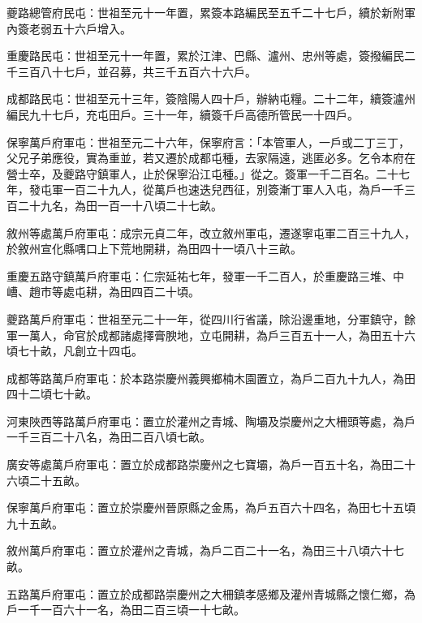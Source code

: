 \begin{pinyinscope}
 夔路總管府民屯：世祖至元十一年置，累簽本路編民至五千二十七戶，續於新附軍內簽老弱五十六戶增入。



 重慶路民屯：世祖至元十一年置，累於江津、巴縣、瀘州、忠州等處，簽撥編民二千三百八十七戶，並召募，共三千五百六十六戶。



 成都路民屯：世祖至元十三年，簽陰陽人四十戶，辦納屯糧。二十二年，續簽瀘州編民九十七戶，充屯田戶。三十一年，續簽千戶高德所管民一十四戶。



 保寧萬戶府軍屯：世祖至元二十六年，保寧府言：「本管軍人，一戶或二丁三丁，父兄子弟應役，實為重並，若又遷於成都屯種，去家隔遠，逃匿必多。乞令本府在營士卒，及夔路守鎮軍人，止於保寧沿江屯種。」從之。簽軍一千二百名。二十七年，發屯軍一百二十九人，從萬戶也速迭兒西征，別簽漸丁軍人入屯，為戶一千三百二十九名，為田一百一十八頃二十七畝。



 敘州等處萬戶府軍屯：成宗元貞二年，改立敘州軍屯，遷遂寧屯軍二百三十九人，於敘州宣化縣喁口上下荒地開耕，為田四十一頃八十三畝。



 重慶五路守鎮萬戶府軍屯：仁宗延祐七年，發軍一千二百人，於重慶路三堆、中嶆、趙市等處屯耕，為田四百二十頃。



 夔路萬戶府軍屯：世祖至元二十一年，從四川行省議，除沿邊重地，分軍鎮守，餘軍一萬人，命官於成都諸處擇膏腴地，立屯開耕，為戶三百五十一人，為田五十六頃七十畝，凡創立十四屯。



 成都等路萬戶府軍屯：於本路崇慶州義興鄉楠木園置立，為戶二百九十九人，為田四十二頃七十畝。



 河東陜西等路萬戶府軍屯：置立於灌州之青城、陶壩及崇慶州之大柵頭等處，為戶一千三百二十八名，為田二百八頃七畝。



 廣安等處萬戶府軍屯：置立於成都路崇慶州之七寶壩，為戶一百五十名，為田二十六頃二十五畝。



 保寧萬戶府軍屯：置立於崇慶州晉原縣之金馬，為戶五百六十四名，為田七十五頃九十五畝。



 敘州萬戶府軍屯：置立於灌州之青城，為戶二百二十一名，為田三十八頃六十七畝。



 五路萬戶府軍屯：置立於成都路崇慶州之大柵鎮孝感鄉及灌州青城縣之懷仁鄉，為戶一千一百六十一名，為田二百三頃一十七畝。




\end{pinyinscope}
